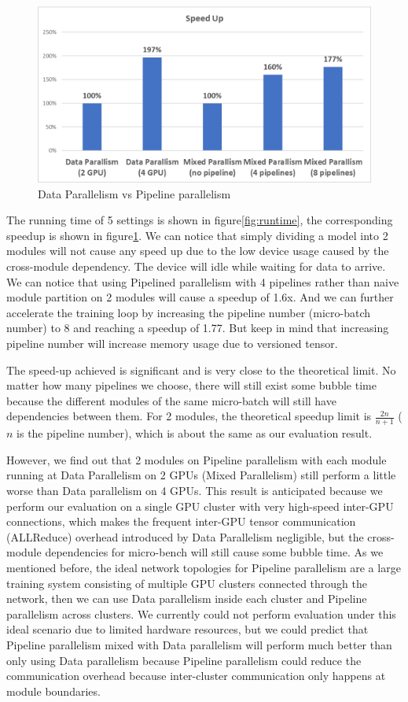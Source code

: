 \documentclass[sigplan]{acmart}\settopmatter{printfolios=true,printccs=false,printacmref=false}
\begin{document}
\begin{figure}[htbp]
  \centering
  \includegraphics[scale=0.5]{pipelineparallelspeedup.png}
  \caption{Data Parallelism vs Pipeline parallelism}
  \label{fig:speedup}
\end{figure}
 The running time of 5 settings is shown in figure\ref{fig:runtime}, the corresponding speedup is shown in figure\ref{fig:speedup}. We can notice that simply dividing a model into 2 modules will not cause any speed up due to the low device usage caused by the cross-module dependency. The device will idle while waiting for data to arrive. We can notice that using Pipelined parallelism with 4 pipelines rather than naive module partition on 2 modules will cause a speedup of 1.6x. And we can further accelerate the training loop by increasing the pipeline number (micro-batch number) to 8 and reaching a speedup of 1.77. But keep in mind that increasing pipeline number will increase memory usage due to versioned tensor.\par
 The speed-up achieved is significant and is very close to the theoretical limit. No matter how many pipelines we choose, there will still exist some bubble time because the different modules of the same micro-batch will still have dependencies between them. For 2 modules, the theoretical speedup limit is $\frac{2n}{n+1}$ ($n$ is the pipeline number), which is about the same as our evaluation result.\par
 However, we find out that 2 modules on Pipeline parallelism with each module running at Data Parallelism on 2 GPUs (Mixed Parallelism) still perform a little worse than Data parallelism on 4 GPUs. This result is anticipated because we perform our evaluation on a single GPU cluster with very high-speed inter-GPU connections, which makes the frequent inter-GPU tensor communication (ALLReduce) overhead introduced by Data Parallelism negligible, but the cross-module dependencies for micro-bench will still cause some bubble time. As we mentioned before, the ideal network topologies for Pipeline parallelism are a large training system consisting of multiple GPU clusters connected through the network, then we can use Data parallelism inside each cluster and Pipeline parallelism across clusters. We currently could not perform evaluation under this ideal scenario due to limited hardware resources, but we could predict that Pipeline parallelism mixed with Data parallelism will perform much better than only using Data parallelism because Pipeline parallelism could reduce the communication overhead because inter-cluster communication only happens at module boundaries.\par
\end{document}
